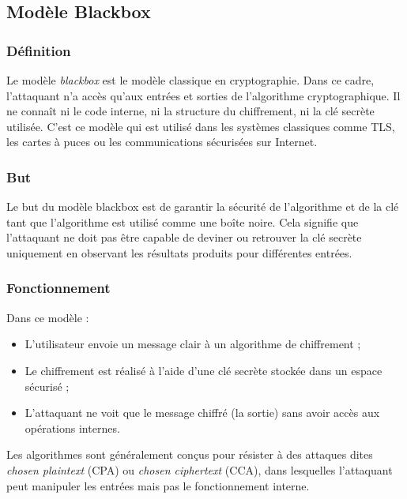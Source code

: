 \documentclass[a4paper, 10pt]{article}
\begin{document}
  \vspace{0.5cm}

\subsection{Modèle Blackbox}

\subsubsection{Définition}

Le modèle \textit{blackbox} est le modèle classique en cryptographie. Dans ce cadre, 
l’attaquant n’a accès qu’aux entrées et sorties de l’algorithme cryptographique. Il ne 
connaît ni le code interne, ni la structure du chiffrement, ni la clé secrète utilisée. 
C’est ce modèle qui est utilisé dans les systèmes classiques comme TLS, les cartes à puces 
ou les communications sécurisées sur Internet.

\subsubsection{But}

Le but du modèle blackbox est de garantir la sécurité de l’algorithme et de la clé tant que l’algorithme est utilisé comme une boîte noire. Cela signifie que l’attaquant ne doit pas être capable de deviner ou retrouver la clé secrète uniquement en observant les résultats produits pour différentes entrées.

\subsubsection{Fonctionnement}

Dans ce modèle :

\begin{itemize}
  \item L’utilisateur envoie un message clair à un algorithme de chiffrement ;
  \item Le chiffrement est réalisé à l’aide d’une clé secrète stockée dans un espace sécurisé ;
  \item L’attaquant ne voit que le message chiffré (la sortie) sans avoir accès aux opérations internes.
\end{itemize}

Les algorithmes sont généralement conçus pour résister à des attaques dites \textit{chosen plaintext} (CPA) ou \textit{chosen ciphertext} (CCA), dans lesquelles l’attaquant peut manipuler les entrées mais pas le fonctionnement interne.
\end{document}
